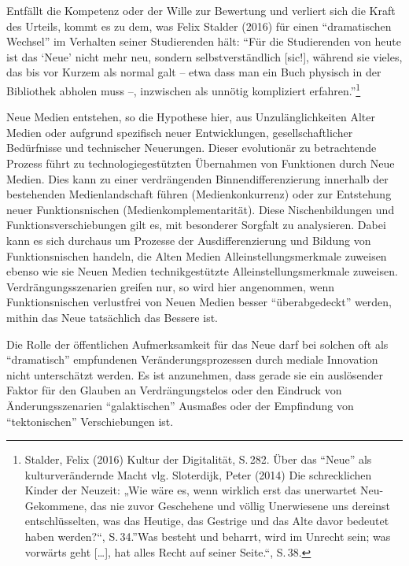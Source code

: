 \documentclass[a4paper,
fontsize=11pt,
oneside,
numbers=noperiodatend,
parskip=half-,
bibliography=totoc,
final
]{scrartcl}
\begin{document}
Entfällt die Kompetenz oder der Wille zur Bewertung und verliert sich
die Kraft des Urteils, kommt es zu dem, was Felix Stalder (2016) für
einen \enquote{dramatischen Wechsel} im Verhalten seiner Studierenden
hält: \enquote{Für die Studierenden von heute ist das \enquote{Neue}
nicht mehr neu, sondern selbstverständlich {[}sic!{]}, während sie
vieles, das bis vor Kurzem als normal galt -- etwa dass man ein Buch
physisch in der Bibliothek abholen muss --, inzwischen als unnötig
kompliziert erfahren.}\footnote{Stalder, Felix (2016) Kultur der
  Digitalität, S.\,282. Über das \enquote{Neue} als kulturverändernde
  Macht vlg. Sloterdijk, Peter (2014) Die schrecklichen Kinder der
  Neuzeit: „Wie wäre es, wenn wirklich erst das unerwartet
  Neu-Gekommene, das nie zuvor Geschehene und völlig Unerwiesene uns
  dereinst entschlüsselten, was das Heutige, das Gestrige und das Alte
  davor bedeutet haben werden?\enquote{, S.\,34.}Was besteht und beharrt,
  wird im Unrecht sein; was vorwärts geht {[}\ldots{}{]}, hat alles
  Recht auf seiner Seite.``, S.\,38.}

Neue Medien entstehen, so die Hypothese hier, aus Unzulänglichkeiten
Alter Medien oder aufgrund spezifisch neuer Entwicklungen,
gesellschaftlicher Bedürfnisse und technischer Neuerungen. Dieser
evolutionär zu betrachtende Prozess führt zu technologiegestützten
Übernahmen von Funktionen durch Neue Medien. Dies kann zu einer
verdrängenden Binnendifferenzierung innerhalb der bestehenden
Medienlandschaft führen (Medienkonkurrenz) oder zur Entstehung neuer
Funktionsnischen (Medienkomplementarität). Diese Nischenbildungen und
Funktionsverschiebungen gilt es, mit besonderer Sorgfalt zu analysieren.
Dabei kann es sich durchaus um Prozesse der Ausdifferenzierung und
Bildung von Funktionsnischen handeln, die Alten Medien
Alleinstellungsmerkmale zuweisen ebenso wie sie Neuen Medien
technikgestützte Alleinstellungsmerkmale zuweisen. Verdrängungsszenarien
greifen nur, so wird hier angenommen, wenn Funktionsnischen verlustfrei
von Neuen Medien besser \enquote{überabgedeckt} werden, mithin das Neue
tatsächlich das Bessere ist.

Die Rolle der öffentlichen Aufmerksamkeit für das Neue darf bei solchen
oft als \enquote{dramatisch} empfundenen Veränderungsprozessen durch
mediale Innovation nicht unterschätzt werden. Es ist anzunehmen, dass
gerade sie ein auslösender Faktor für den Glauben an Verdrängungstelos
oder den Eindruck von Änderungsszenarien \enquote{galaktischen} Ausmaßes
oder der Empfindung von \enquote{tektonischen} Verschiebungen ist.
\end{document}
